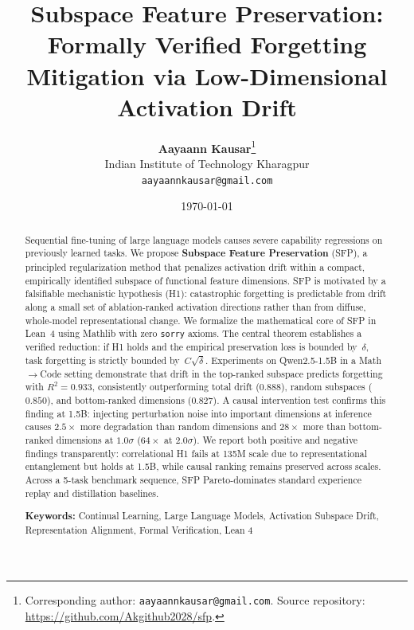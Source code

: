 \documentclass{article}
\title{\textbf{Subspace Feature Preservation:\\Formally Verified Forgetting Mitigation via Low-Dimensional Activation Drift}}
\author{
  \textbf{Aayaann Kausar}\thanks{Corresponding author: \texttt{aayaannkausar@gmail.com}. Source repository: \url{https://github.com/Akgithub2028/sfp}.} \\
  Indian Institute of Technology Kharagpur \\
  \texttt{aayaannkausar@gmail.com}
}
\date{\today}
\begin{document}
\maketitle

\begin{abstract}
Sequential fine-tuning of large language models causes severe capability regressions on previously learned tasks.
We propose \textbf{Subspace Feature Preservation} (SFP), a principled regularization method that penalizes activation drift within a compact, empirically identified subspace of functional feature dimensions.
SFP is motivated by a falsifiable mechanistic hypothesis (H1): catastrophic forgetting is predictable from drift along a small set of ablation-ranked activation directions rather than from diffuse, whole-model representational change.
We formalize the mathematical core of SFP in Lean~4 using Mathlib with zero \texttt{sorry} axioms.
The central theorem establishes a verified reduction: if H1 holds and the empirical preservation loss is bounded by~$\delta$, task forgetting is strictly bounded by~$C\sqrt{\delta}$.
Experiments on Qwen2.5-1.5B in a Math$\to$Code setting demonstrate that drift in the top-ranked subspace predicts forgetting with $R^2 = 0.933$, consistently outperforming total drift ($0.888$), random subspaces ($0.850$), and bottom-ranked dimensions ($0.827$).
A causal intervention test confirms this finding at 1.5B: injecting perturbation noise into important dimensions at inference causes $2.5\times$ more degradation than random dimensions and $28\times$ more than bottom-ranked dimensions at $1.0\sigma$ ($64\times$ at $2.0\sigma$).
We report both positive and negative findings transparently: correlational H1 fails at 135M scale due to representational entanglement but holds at 1.5B, while causal ranking remains preserved across scales.
Across a 5-task benchmark sequence, SFP Pareto-dominates standard experience replay and distillation baselines.

\vspace{0.8em}
\noindent\textbf{Keywords:} Continual Learning, Large Language Models, Activation Subspace Drift, Representation Alignment, Formal Verification, Lean 4
\end{abstract}







{\small


}

\appendix

\end{document}
